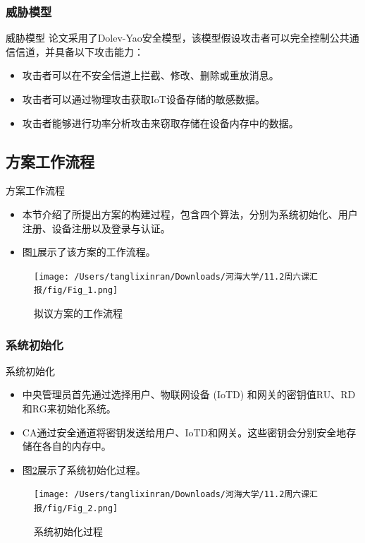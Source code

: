 \documentclass{beamer}
\begin{document}
\subsubsection{威胁模型}
\begin{frame}{威胁模型}
    论文采用了Dolev-Yao安全模型，该模型假设攻击者可以完全控制公共通信信道，并具备以下攻击能力：
    \begin{itemize}
        \item 攻击者可以在不安全信道上拦截、修改、删除或重放消息。
        \item 攻击者可以通过物理攻击获取IoT设备存储的敏感数据。
        \item 攻击者能够进行功率分析攻击来窃取存储在设备内存中的数据。
    \end{itemize}
\end{frame}

\subsection{方案工作流程}
\begin{frame}{方案工作流程}
    \begin{itemize}
        \item 本节介绍了所提出方案的构建过程，包含四个算法，分别为系统初始化、用户注册、设备注册以及登录与认证。
        \item 图\ref{Fig_1}展示了该方案的工作流程。
    \end{itemize}

    \begin{figure}
        \centering
        \texttt{[image: /Users/tanglixinran/Downloads/河海大学/11.2周六课汇报/fig/Fig\_1.png]}
        \caption{拟议方案的工作流程}
        \label{Fig_1}
    \end{figure}
\end{frame}

\subsubsection{系统初始化}
\begin{frame}{系统初始化}
    \begin{itemize}
        \item 中央管理员首先通过选择用户、物联网设备 (IoTD) 和网关的密钥值RU、RD和RG来初始化系统。
        \item CA通过安全通道将密钥发送给用户、IoTD和网关。这些密钥会分别安全地存储在各自的内存中。
        \item 图\ref{Fig_2}展示了系统初始化过程。
    \end{itemize}

    \begin{figure}
        \centering
        \texttt{[image: /Users/tanglixinran/Downloads/河海大学/11.2周六课汇报/fig/Fig\_2.png]} %
        \vspace{-0.8cm}  %
        \caption{系统初始化过程}
        \label{Fig_2}
    \end{figure}
\end{frame}
\end{document}
